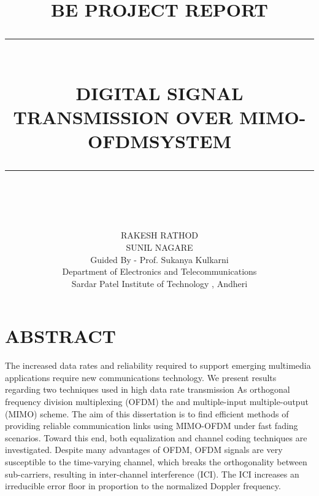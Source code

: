 \documentclass[12pt]{report}
\newcommand{\HRule}[1]{\rule{\linewidth}{#1}}
\begin{document}
\title{ \normalsize \textsc{BE PROJECT REPORT}
		\\ [2.0cm]
		\HRule{0.5pt} \\
		\LARGE \textbf{\uppercase{DIGITAL SIGNAL TRANSMISSION OVER
MIMO-OFDMSYSTEM}}
		\HRule{2pt} \\ [0.5cm]
		\normalsize  \vspace*{5\baselineskip}}

\date{}

\author{
		RAKESH  RATHOD \\
        SUNIL  NAGARE\\
        Guided By - Prof. Sukanya Kulkarni  \\
Department of Electronics and Telecommunications\\
Sardar Patel Institute of Technology , Andheri\\ }

\maketitle

\newpage
\section*{ABSTRACT}

The increased data rates and reliability required to support emerging multimedia applications
require new communications technology. We present results regarding two techniques used
in high data rate transmission As orthogonal frequency division multiplexing (OFDM) the
and multiple-input multiple-output (MIMO) scheme. The aim of this dissertation is to find
efficient methods of providing reliable communication links using MIMO-OFDM under fast
fading scenarios. Toward this end, both equalization and channel coding techniques are
investigated. Despite many advantages of OFDM, OFDM signals are very susceptible to the
time-varying channel, which breaks the orthogonality between sub-carriers, resulting in
inter-channel interference (ICI). The ICI increases an irreducible error floor in proportion to
the normalized Doppler frequency.
\end{document}
